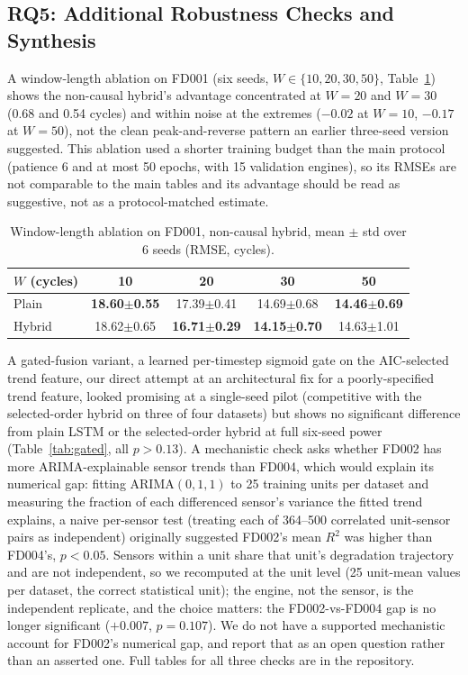 \documentclass[conference]{IEEEtran}
\begin{document}
\subsection{RQ5: Additional Robustness Checks and Synthesis}
A window-length ablation on FD001 (six seeds, $W\in\{10,20,30,50\}$, Table~\ref{tab:ablation}) shows the non-causal hybrid's advantage concentrated at $W{=}20$ and $W{=}30$ (0.68 and 0.54 cycles) and within noise at the extremes ($-0.02$ at $W{=}10$, $-0.17$ at $W{=}50$), not the clean peak-and-reverse pattern an earlier three-seed version suggested. This ablation used a shorter training budget than the main protocol (patience 6 and at most 50 epochs, with 15 validation engines), so its RMSEs are not comparable to the main tables and its advantage should be read as suggestive, not as a protocol-matched estimate.

\begin{table}[t]
\centering
\caption{Window-length ablation on FD001, non-causal hybrid, mean $\pm$ std over 6 seeds (RMSE, cycles).}
\label{tab:ablation}
\footnotesize
\setlength{\tabcolsep}{3pt}
\begin{tabular}{lcccc}
\toprule
$W$ (cycles) & 10 & 20 & 30 & 50 \\
\midrule
Plain & \textbf{18.60{\tiny$\pm$0.55}} & 17.39{\tiny$\pm$0.41} & 14.69{\tiny$\pm$0.68} & \textbf{14.46{\tiny$\pm$0.69}} \\
Hybrid & 18.62{\tiny$\pm$0.65} & \textbf{16.71{\tiny$\pm$0.29}} & \textbf{14.15{\tiny$\pm$0.70}} & 14.63{\tiny$\pm$1.01} \\
\bottomrule
\end{tabular}
\end{table} A gated-fusion variant, a learned per-timestep sigmoid gate on the AIC-selected trend feature, our direct attempt at an architectural fix for a poorly-specified trend feature, looked promising at a single-seed pilot (competitive with the selected-order hybrid on three of four datasets) but shows no significant difference from plain LSTM or the selected-order hybrid at full six-seed power (Table~\ref{tab:gated}, all $p>0.13$). A mechanistic check asks whether FD002 has more ARIMA-explainable sensor trends than FD004, which would explain its numerical gap: fitting ARIMA$(0,1,1)$ to 25 training units per dataset and measuring the fraction of each differenced sensor's variance the fitted trend explains, a naive per-sensor test (treating each of 364--500 correlated unit-sensor pairs as independent) originally suggested FD002's mean $R^2$ was higher than FD004's, $p<0.05$. Sensors within a unit share that unit's degradation trajectory and are not independent, so we recomputed at the unit level (25 unit-mean values per dataset, the correct statistical unit); the engine, not the sensor, is the independent replicate, and the choice matters: the FD002-vs-FD004 gap is no longer significant ($+0.007$, $p=0.107$). We do not have a supported mechanistic account for FD002's numerical gap, and report that as an open question rather than an asserted one. Full tables for all three checks are in the repository.
\end{document}
